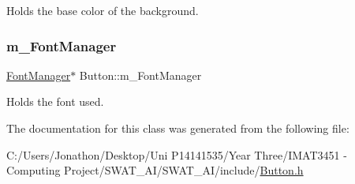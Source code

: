 Holds the base color of the background. 

\mbox{\label{class_button_a65bbfab1d336ca64f5d32baca218139c}} 
\subsubsection{\texorpdfstring{m\+\_\+\+Font\+Manager}{m\_FontManager}}
{\footnotesize\ttfamily \hyperlink{class_font_manager}{Font\+Manager}$\ast$ Button\+::m\+\_\+\+Font\+Manager\hspace{0.3cm}{\ttfamily [private]}}



Holds the font used. 



The documentation for this class was generated from the following file\+:\begin{DoxyCompactItemize}
\item 
C\+:/\+Users/\+Jonathon/\+Desktop/\+Uni P14141535/\+Year Three/\+I\+M\+A\+T3451 -\/ Computing Project/\+S\+W\+A\+T\+\_\+\+A\+I/\+S\+W\+A\+T\+\_\+\+A\+I/include/\hyperlink{_button_8h}{Button.\+h}\end{DoxyCompactItemize}
